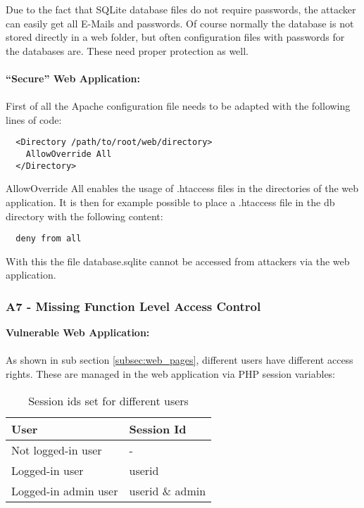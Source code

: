 Due to the fact that SQLite database files do not require passwords, the attacker can easily get all E-Mails and passwords. Of course normally the database is not stored directly in a web folder, but often configuration files with passwords for the databases are. These need proper protection as well.\\
\\
\textbf{``Secure'' Web Application:} \\
\\
First of all the Apache configuration file needs to be adapted with the following lines of code:

\begin{lstlisting}
  <Directory /path/to/root/web/directory>
    AllowOverride All
  </Directory>
\end{lstlisting}

AllowOverride All enables the usage of .htaccess files in the directories of the web application. It is then for example possible to place a .htaccess file in the db directory with the following content:

\begin{lstlisting}
  deny from all
\end{lstlisting}

With this the file database.sqlite cannot be accessed from attackers via the web application.


\subsubsection{A7 - Missing Function Level Access Control}

\textbf{Vulnerable Web Application:} \\
\\
As shown in sub section \ref{subsec:web_pages}, different users have different access rights. These are managed in the web application via PHP session variables:

\begin{table}[htbp]
  \begin{center}
    \begin{tabularx}{\textwidth}{|X|X|}
      \hline
      \textbf{User} & \textbf{Session Id}  \\
      \hline
      \hline
      Not logged-in user & - \\
      \hline
      Logged-in user & userid \\
      \hline
      Logged-in admin user & userid \& admin \\
      \hline
    \end{tabularx}
    \caption{Session ids set for different users}
    \label{tab:software_components}
  \end{center}
\end{table}

